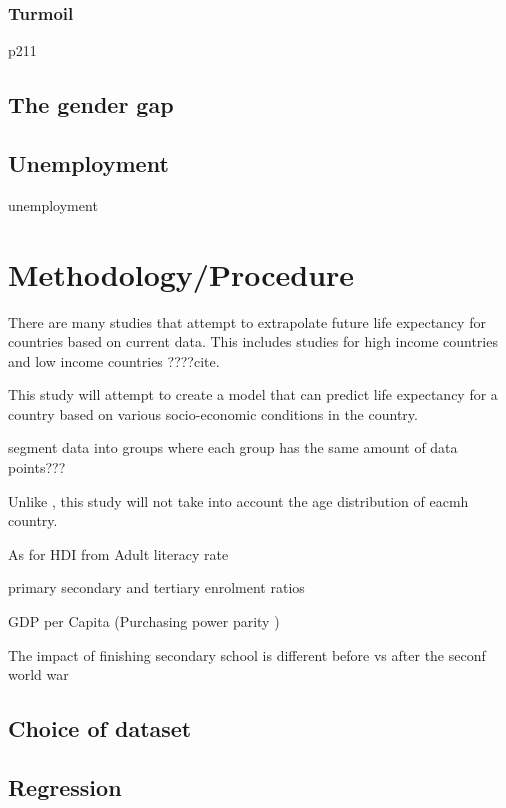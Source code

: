 \documentclass[10pt,a4paper]{article}
\begin{document}
\cite{CDC1999}

\subsubsection{Turmoil}
\citep{Low2008} p211

\subsection{The gender gap}

\cite{Rochelle2015}

\subsection{Unemployment}
unemployment \cite{Bonamore2015} \cite{Roelfs2011} \cite{Roelfs2015} 

\section{Methodology/Procedure}

There are many studies that attempt to extrapolate future life expectancy for countries based on current data. This includes studies for high income countries \citep{Kontis2017} and low income countries ????{cite}.

This study will attempt to create a model that can predict life expectancy for a country based on various socio-economic conditions in the country.



segment data into groups where each group has the same amount of data points???

Unlike \cite{Shaw2005}, this study will not take into account the age distribution of eacmh country.

As for HDI from \cite{Bulled2010}
Adult literacy rate

primary secondary and tertiary enrolment ratios

GDP per Capita (Purchasing power parity )


The impact of finishing secondary school is different before vs after the seconf world war \cite{Deboosere2009}

\subsection{Choice of dataset}

\subsection{Regression}
\end{document}
